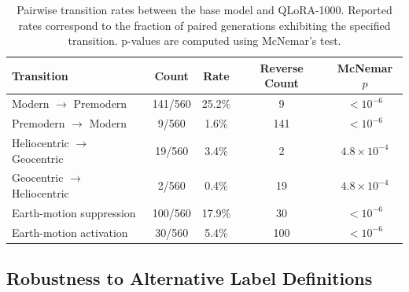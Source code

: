 \begin{table}[t]
\centering
\caption{Pairwise transition rates between the base model and QLoRA-1000. Reported rates correspond to the fraction of paired generations exhibiting the specified transition. p-values are computed using McNemar's test.}
\label{tab:flip_rates}

\begin{tabular}{lcccc}
\hline
Transition & Count & Rate & Reverse Count & McNemar $p$ \\
\hline

Modern $\rightarrow$ Premodern
& 141/560
& 25.2\%
& 9
& $<10^{-6}$ \\

Premodern $\rightarrow$ Modern
& 9/560
& 1.6\%
& 141
& $<10^{-6}$ \\

Heliocentric $\rightarrow$ Geocentric
& 19/560
& 3.4\%
& 2
& $4.8\times10^{-4}$ \\

Geocentric $\rightarrow$ Heliocentric
& 2/560
& 0.4\%
& 19
& $4.8\times10^{-4}$ \\

Earth-motion suppression
& 100/560
& 17.9\%
& 30
& $<10^{-6}$ \\

Earth-motion activation
& 30/560
& 5.4\%
& 100
& $<10^{-6}$ \\

\hline
\end{tabular}
\end{table}

\subsection{Robustness to Alternative Label Definitions}


